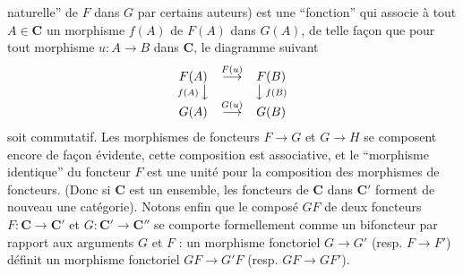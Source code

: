 
\noindent naturelle'' de $F$ dans $G$ par certains auteurs) est une
``fonction'' qui associe à tout $A\in \mathbf{C}$ un morphisme $f(A)$ de $F(A)$ dans
$G(A)$, de telle façon que pour tout morphisme $u:A\to B$ dans
$\mathbf{C}$, le diagramme suivant
\[
\begin{array}{ccc}
F(A) & \stackrel{F(u)}{\longrightarrow} & F(B) \\
{\scriptstyle f(A)}\,\big\downarrow && \big\downarrow\,{\scriptstyle f(B)} \\
G(A) & \stackrel{G(u)}{\longrightarrow} & G(B)
\end{array}
\]
soit commutatif. Les morphismes de foncteurs $F\to G$ et
$G\to H$ se composent encore de façon évidente, cette composition
est associative, et le ``morphisme identique'' du foncteur $F$ est une unité
pour la composition des morphismes de foncteurs. (Donc si $\mathbf{C}$ est un ensemble,
les foncteurs de $\mathbf{C}$ dans $\mathbf{C}'$ forment de nouveau une catégorie). Notons enfin
que le composé $GF$ de deux foncteurs $F:\mathbf{C}\to \mathbf{C}'$ et
$G:\mathbf{C}'\to \mathbf{C}''$ se comporte formellement comme un bifoncteur par
rapport aux arguments $G$ et $F$ : un morphisme fonctoriel
$G\to G'$ (resp. $F\to F'$) définit un morphisme
fonctoriel $GF\to G'F$ (resp. $GF\to GF'$).

